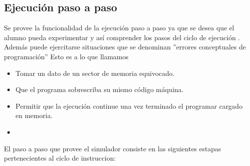 \subsection{Ejecución paso a paso}

Se provee la funcionalidad de la ejecución paso a paso ya que se desea que el alumno pueda experimentar y así comprender los pasos del ciclo de ejecución . Además puede ejercitarse situaciones que se denominan ''errores conceptuales de programación'' Esto es a lo que llamamos 

\begin{itemize}
\item Tomar un dato de un sector de memoria equivocado.
\item Que el programa sobrescriba su mismo código máquina.
\item Permitir que la ejecución continue una vez terminado el programar cargado en memoria.
\item 
\end{itemize}

El paso a paso que provee el simulador consiste en las siguientes estapas pertenecientes al ciclo de instruccion:

